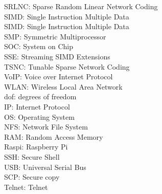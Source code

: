 \documentclass[electronics,article,submit,moreauthors,pdftex,10pt,a4paper]{mdpi}
\theoremstyle{mdpi}
\newcounter{ex}
\newcounter{re}
\theoremstyle{mdpidefinition}
\begin{document}
{SRLNC: Sparse Random Linear Network Coding\\
SIMD: Single Instruction Multiple Data\\
SIMD: Single Instruction Multiple Data\\
SMP: Symmetric Multiprocessor\\
SOC: System on Chip\\
SSE: Streaming SIMD Extensions\\
TSNC: Tunable Sparse Network Coding\\
VoIP: Voice over Internet Protocol\\
WLAN: Wireless Local Area Network\\
dof: degrees of freedom\\
IP: Internet Protocol\\
OS: Operating System\\
NFS: Network File System\\
RAM: Random Access Memory\\
Raspi: Raspberry Pi\\
SSH: Secure Shell\\
USB: Universal Serial Bus\\
SCP: Secure copy\\
Telnet: Telnet}




\end{document}
